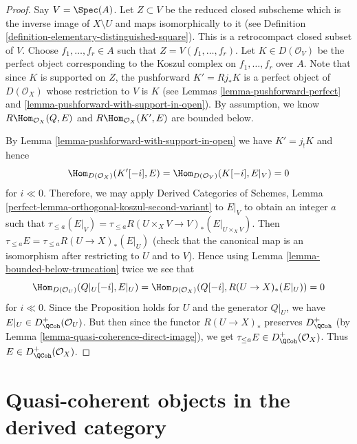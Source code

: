 \begin{proof}
\medskip\noindent
Say $V = \Spec(A)$. Let $Z \subset V$ be the reduced closed subscheme
which is the inverse image of $X \setminus U$ and maps isomorphically to it
(see Definition \ref{definition-elementary-distinguished-square}).
This is a retrocompact closed subset of $V$.
Choose $f_1, \ldots, f_r \in A$ such that
$Z = V(f_1, \ldots, f_r)$. Let $K \in D(\mathcal{O}_V)$ be the perfect
object corresponding to the Koszul complex on $f_1, \ldots, f_r$ over $A$.
Note that since $K$ is supported on $Z$, the pushforward
$K' = Rj_*K$ is a perfect object of $D(\mathcal{O}_X)$ whose
restriction to $V$ is $K$ (see Lemmas \ref{lemma-pushforward-perfect}
and \ref{lemma-pushforward-with-support-in-open}).
By assumption, we know $R\Hom_{\mathcal{O}_X}(Q, E)$ and
$R\Hom_{\mathcal{O}_X}(K', E)$ are bounded below.

\medskip\noindent
By Lemma \ref{lemma-pushforward-with-support-in-open}
we have $K' =  j_!K$ and hence
$$
\Hom_{D(\mathcal{O}_X)}(K'[-i], E) = \Hom_{D(\mathcal{O}_V)}(K[-i], E|_V) = 0
$$
for $i \ll 0$. Therefore, we may apply
Derived Categories of Schemes,
Lemma \ref{perfect-lemma-orthogonal-koszul-second-variant} to $E|_V$ to
obtain an integer $a$ such that
$\tau_{\leq a}(E|_V) =
\tau_{\leq a} R (U \times_X V \to V)_* (E|_{U \times_X V})$.
Then $\tau_{\leq a} E = \tau_{\leq a} R (U \to X)_* (E |_U)$
(check that the canonical map is an isomorphism after restricting to
$U$ and to $V$). Hence using Lemma \ref{lemma-bounded-below-truncation}
twice we see that
$$
\Hom_{D(\mathcal{O}_U)}(Q|_U [-i], E|_U) =
\Hom_{D(\mathcal{O}_X)}(Q[-i], R (U \to X)_* (E|_U)) = 0
$$
for $i \ll 0$. Since the Proposition holds for $U$ and the generator
$Q|_U$, we have $E|_U \in D^+_\QCoh(\mathcal{O}_U)$. But then since
the functor $R (U \to X)_*$ preserves $D^+_\QCoh$
(by Lemma \ref{lemma-quasi-coherence-direct-image}), we get
$\tau_{\leq a}E \in D^+_\QCoh(\mathcal{O}_X)$. Thus
$E \in D^+_\QCoh (\mathcal{O}_X)$.
\end{proof}










\section{Quasi-coherent objects in the derived category}
\label{section-QC}

